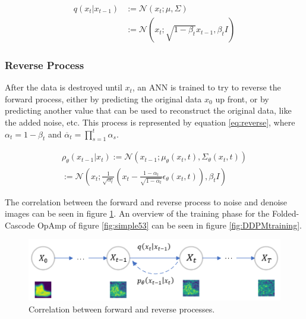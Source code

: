 \documentclass[conference]{IEEEtran}
\begin{document}
	\begin{equation} \label{eq:forward}
	\begin{aligned}
	q(x_{t}|x_{t-1}) &:= \mathcal{N}(x_{t};\mu,\Sigma) \\ &:= \mathcal{N}(x_{t};\sqrt{1-\beta_{t}}x_{t-1}, \beta_{t}I)
	\end{aligned}
	\end{equation}
	
	\subsubsection{Reverse Process}
	After the data is destroyed until $x_{t}$, an ANN is trained to try to reverse the forward process, either by predicting the original data $x_{0}$ up front, or by predicting another value that can be used to reconstruct the original data, like the added noise, etc. This process is represented by equation \ref{eq:reverse}, where $\alpha_{t}=1-\beta_{t}$ and $\overline{\alpha}_{t}=\prod_{s=1}^{t}\alpha_{s}$.
	
	\begin{equation} \label{eq:reverse}
	\begin{split}
		\rho_{\theta}(x_{t-1}|x_{t}) := \mathcal{N}(x_{t-1};\mu_{\theta}(x_{t},t),\Sigma_{\theta}(x_{t},t)) \\:= \mathcal{N}(x_{t};\frac{1}{\sqrt{\alpha_{t}}}(x_{t}-\frac{1-\alpha_{t}}{\sqrt{1-\overline{\alpha}_{t}}}\epsilon_{\theta}(x_{t},t)),\beta_{t}I) 
	\end{split}
	\end{equation}
	
	The correlation between the forward and reverse process to noise and denoise images can be seen in figure \ref{fig:forward_reverse}. An overview of the training phase for the Folded-Cascode OpAmp of figure \ref{fig:simple53} can be seen in figure \ref{fig:DDPMtraining}.
	
	\begin{figure}[h]
		\centering
		\includegraphics[width=\linewidth]{figures/ForwardReverseDDPM}
		\setlength{\abovecaptionskip}{0ex}%
		\setlength{\belowcaptionskip}{-2ex}%
		\caption{Correlation between forward and reverse processes.}
		\label{fig:forward_reverse}
	\end{figure}
	
\end{document}
